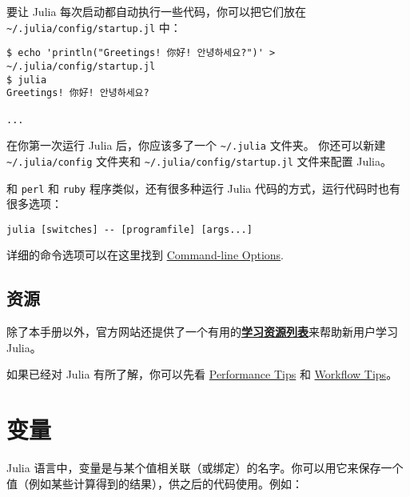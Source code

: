 要让 Julia 每次启动都自动执行一些代码，你可以把它们放在 \texttt{{\textasciitilde}/.julia/config/startup.jl} 中：




\begin{lstlisting}
$ echo 'println("Greetings! 你好! 안녕하세요?")' > ~/.julia/config/startup.jl
$ julia
Greetings! 你好! 안녕하세요?

...
\end{lstlisting}



在你第一次运行 Julia 后，你应该多了一个 \texttt{{\textasciitilde}/.julia} 文件夹。 你还可以新建 \texttt{{\textasciitilde}/.julia/config} 文件夹和 \texttt{{\textasciitilde}/.julia/config/startup.jl} 文件来配置 Julia。



和 \texttt{perl} 和 \texttt{ruby} 程序类似，还有很多种运行 Julia 代码的方式，运行代码时也有很多选项：




\begin{lstlisting}
julia [switches] -- [programfile] [args...]
\end{lstlisting}



详细的命令选项可以在这里找到 \hyperlink{631314801744611}{Command-line Options}.



\hypertarget{17073013932993739054}{}


\section{资源}



除了本手册以外，官方网站还提供了一个有用的\textbf{\href{https://julialang.org/learning/}{学习资源列表}}来帮助新用户学习 Julia。



如果已经对 Julia 有所了解，你可以先看 \hyperlink{818954303942149020}{Performance Tips} 和 \hyperlink{6293662380888380710}{Workflow Tips}。



\hypertarget{10731958648755981077}{}


\chapter{变量}



Julia 语言中，变量是与某个值相关联（或绑定）的名字。你可以用它来保存一个值（例如某些计算得到的结果），供之后的代码使用。例如：




